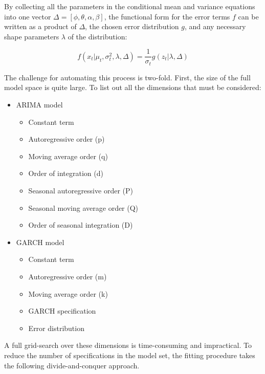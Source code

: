 \documentclass[12pt]{article}
\begin{document}
By collecting all the parameters in the conditional mean and variance equations into one vector $\Delta = [\phi, \theta, \alpha, \beta]$, the functional form for the error terms $f$ can be written as a product of $\Delta$, the chosen error distribution $g$, and any necessary shape parameters $\lambda$ of the distribution:

\begin{equation} \label{eq:conditional_distr}
    f(x_{t} | \mu_{t}, \sigma^{2}_{t}, \lambda, \Delta) = \frac{1}{\sigma_{t}} g(z_{t} | \lambda, \Delta)
\end{equation}

The challenge for automating this process is two-fold. First, the size of the full model space is quite large. To list out all the dimensions that must be considered:

\begin{itemize}
    \item ARIMA model
        \begin{itemize}
            \item Constant term
            \item Autoregressive order (p)
            \item Moving average order (q)
            \item Order of integration (d)
            \item Seasonal autoregressive order (P)
            \item Seasonal moving average order (Q)
            \item Order of seasonal integration (D)
        \end{itemize}
        \item GARCH model
        \begin{itemize}
            \item Constant term
            \item Autoregressive order (m)
            \item Moving average order (k)
            \item GARCH specification
            \item Error distribution
        \end{itemize}

\end{itemize}

A full grid-search over these dimensions is time-consuming and impractical. To reduce the number of specifications in the model set, the fitting procedure takes the following divide-and-conquer approach.
\end{document}
